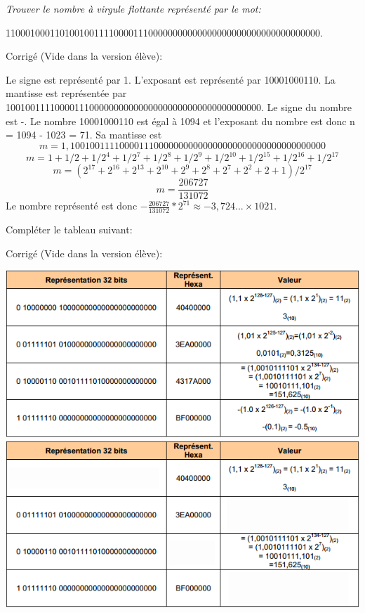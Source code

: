 \documentclass[10pt,fleqn]{article} %
\begin{document}
\begin{exercice}
\textit{Trouver le nombre à virgule flottante représenté par le mot:}

1100010001101001001111000011100000000000000000000000000000000000.

\ifprof
Corrigé (Vide dans la version élève):

Le signe est représenté par 1.
L’exposant est représenté par 10001000110.
La mantisse est représentée par
1001001111000011100000000000000000000000000000000000.
Le signe du nombre est -. Le nombre 10001000110 est égal à 1094 et l’exposant du nombre est donc
n = 1094 - 1023 = 71. Sa mantisse est
$$m = 1, 1001001111000011100000000000000000000000000000000000$$
$$m= 1 + 1/2 + 1/2^4 + 1/2^7 + 1/2^8 + 1/2^9 + 1/2^{10} + 1/2^{15} + 1/2^{16} + 1/2^{17}$$
$$m= (2^{17} + 2^{16} + 2^{13} + 2^{10} + 2^9 + 2^8 + 2^7 + 2^2 + 2 + 1)/2^{17}$$
$$m= \frac{206727}{131072}$$
Le nombre représenté est donc $- \frac{206727}{131072}*2^{71} \approx -3, 724 . . . × 1021$.
\else
\fi
\end{exercice}

\begin{exercice}
Compléter le tableau suivant:
\begin{center}
\ifprof
Corrigé (Vide dans la version élève):

\includegraphics[width=.7\textwidth]{images/exo.png}
\else
\includegraphics[width=.7\textwidth]{images/exo2.png}
\fi
\end{center}
\end{exercice}
\end{document}
